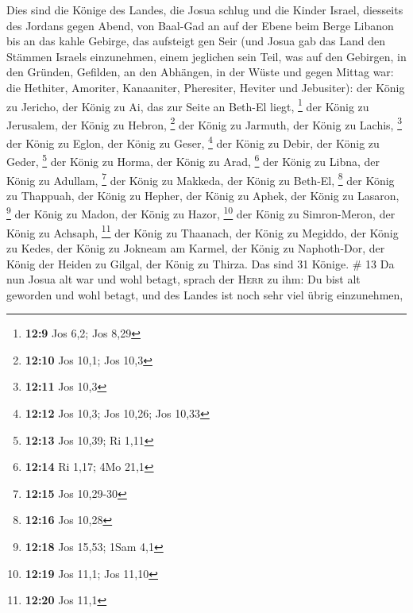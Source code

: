  Dies sind die Könige des Landes, die Josua schlug und die
Kinder Israel, diesseits des Jordans gegen Abend, von Baal-Gad an auf
der Ebene beim Berge Libanon bis an das kahle Gebirge, das aufsteigt gen
Seir (und Josua gab das Land den Stämmen Israels einzunehmen, einem
jeglichen sein Teil,  was auf den Gebirgen, in den
Gründen, Gefilden, an den Abhängen, in der Wüste und gegen Mittag war:
die Hethiter, Amoriter, Kanaaniter, Pheresiter, Heviter und Jebusiter):
 der König zu Jericho, der König zu Ai, das zur Seite an
Beth-El liegt, \footnote{\textbf{12:9} Jos 6,2; Jos 8,29}
 der König zu Jerusalem, der König zu Hebron, \footnote{\textbf{12:10}
  Jos 10,1; Jos 10,3}  der König zu Jarmuth, der König zu
Lachis, \footnote{\textbf{12:11} Jos 10,3}  der König zu
Eglon, der König zu Geser, \footnote{\textbf{12:12} Jos 10,3; Jos 10,26;
  Jos 10,33}  der König zu Debir, der König zu Geder,
\footnote{\textbf{12:13} Jos 10,39; Ri 1,11}  der König
zu Horma, der König zu Arad, \footnote{\textbf{12:14} Ri 1,17; 4Mo 21,1}
 der König zu Libna, der König zu Adullam, \footnote{\textbf{12:15}
  Jos 10,29-30}  der König zu Makkeda, der König zu
Beth-El, \footnote{\textbf{12:16} Jos 10,28}  der König
zu Thappuah, der König zu Hepher,  der König zu Aphek,
der König zu Lasaron, \footnote{\textbf{12:18} Jos 15,53; 1Sam 4,1}
 der König zu Madon, der König zu Hazor, \footnote{\textbf{12:19}
  Jos 11,1; Jos 11,10}  der König zu Simron-Meron, der
König zu Achsaph, \footnote{\textbf{12:20} Jos 11,1}  der
König zu Thaanach, der König zu Megiddo,  der König zu
Kedes, der König zu Jokneam am Karmel,  der König zu
Naphoth-Dor, der König der Heiden zu Gilgal,  der König
zu Thirza. Das sind 31 Könige. \# 13  Da nun Josua alt war
und wohl betagt, sprach der \textsc{Herr} zu ihm: Du bist alt geworden
und wohl betagt, und des Landes ist noch sehr viel übrig einzunehmen,

